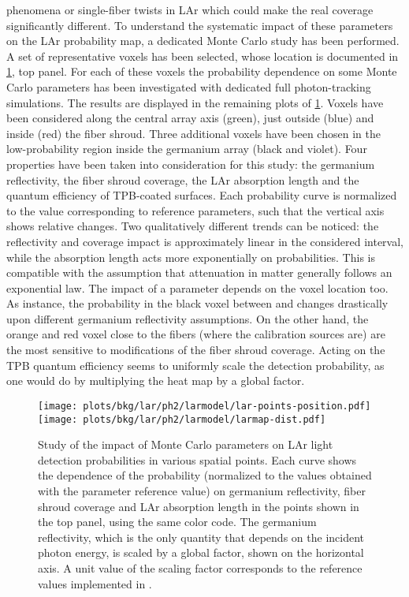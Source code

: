 phenomena or single-fiber twists in LAr which could make the real coverage significantly
different.
\newpar
To understand the systematic impact of these parameters on the LAr probability map, a
dedicated Monte Carlo study has been performed. A set of representative voxels has been
selected, whose location is documented in \cref{fig:bkg:lar:ph2:larmap:dist}, top panel.
For each of these voxels the probability dependence on some Monte Carlo parameters has
been investigated with dedicated full photon-tracking simulations. The results are
displayed in the remaining plots of \cref{fig:bkg:lar:ph2:larmap:dist}. Voxels have been
considered along the central array axis (green), just outside (blue) and inside (red) the
fiber shroud. Three additional voxels have been chosen in the low-probability region
inside the germanium array (black and violet). Four properties have been taken into
consideration for this study: the germanium reflectivity, the fiber shroud coverage,
the LAr absorption length and the quantum efficiency of TPB-coated surfaces. Each
probability curve is normalized to the value corresponding to reference parameters, such
that the vertical axis shows relative changes. Two qualitatively different trends can be
noticed: the reflectivity and coverage impact is approximately linear in the considered
interval, while the absorption length acts more exponentially on probabilities.  This is
compatible with the assumption that attenuation in matter generally follows an exponential
law. The impact of a parameter depends on the voxel location too. As instance, the
probability in the black voxel between  and  changes drastically upon
different germanium reflectivity assumptions. On the other hand, the orange and red voxel
close to the fibers (where the calibration sources are) are the most sensitive to
modifications of the fiber shroud coverage. Acting on the TPB quantum efficiency seems to
uniformly scale the detection probability, as one would do by multiplying the heat map by
a global factor.

\begin{figure}
  \centering
  \texttt{[image: plots/bkg/lar/ph2/larmodel/lar-points-position.pdf]}
  \texttt{[image: plots/bkg/lar/ph2/larmodel/larmap-dist.pdf]}
  \caption{%
    Study of the impact of Monte Carlo parameters on LAr light detection probabilities in
    various spatial points. Each curve shows the dependence of the probability (normalized
    to the values obtained with the parameter reference value) on germanium reflectivity,
    fiber shroud coverage and LAr absorption length in the points shown in the top panel,
    using the same color code. The germanium reflectivity, which is the only quantity that
    depends on the incident photon energy, is scaled by a global factor, shown on the
    horizontal axis. A unit value of the scaling factor corresponds to the reference
    values implemented in \mage.
  }\label{fig:bkg:lar:ph2:larmap:dist}
\end{figure}

